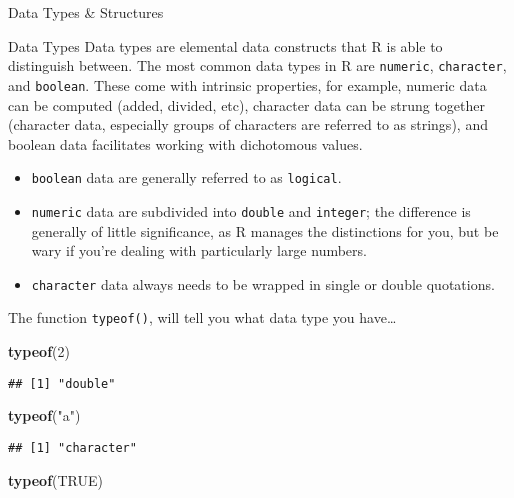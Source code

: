 \documentclass[
  ignorenonframetext,
]{beamer}
\newenvironment{Shaded}{\begin{snugshade}}{\end{snugshade}}
\newcommand{\ConstantTok}[1]{\textcolor[rgb]{0.56,0.35,0.01}{#1}}
\newcommand{\DecValTok}[1]{\textcolor[rgb]{0.00,0.00,0.81}{#1}}
\newcommand{\FunctionTok}[1]{\textcolor[rgb]{0.13,0.29,0.53}{\textbf{#1}}}
\newcommand{\NormalTok}[1]{#1}
\newcommand{\StringTok}[1]{\textcolor[rgb]{0.31,0.60,0.02}{#1}}
\providecommand{\tightlist}{%
  \setlength{\itemsep}{0pt}\setlength{\parskip}{0pt}}
\begin{document}
\begin{frame}[fragile]{Data Types \& Structures}
\protect\hypertarget{data-types-structures}{}
\begin{block}{Data Types}
\protect\hypertarget{data-types}{}
Data types are elemental data constructs that R is able to distinguish
between. The most common data types in R are \texttt{numeric},
\texttt{character}, and \texttt{boolean}. These come with intrinsic
properties, for example, numeric data can be computed (added, divided,
etc), character data can be strung together (character data, especially
groups of characters are referred to as strings), and boolean data
facilitates working with dichotomous values.

\begin{itemize}
\tightlist
\item
  \texttt{boolean} data are generally referred to as \texttt{logical}.
\item
  \texttt{numeric} data are subdivided into \texttt{double} and
  \texttt{integer}; the difference is generally of little significance,
  as R manages the distinctions for you, but be wary if you're dealing
  with particularly large numbers.
\item
  \texttt{character} data always needs to be wrapped in single or double
  quotations.
\end{itemize}

The function \texttt{typeof()}, will tell you what data type you
have\ldots{}

\begin{Shaded}
\begin{Highlighting}[]
\FunctionTok{typeof}\NormalTok{(}\DecValTok{2}\NormalTok{)}
\end{Highlighting}
\end{Shaded}

\begin{verbatim}
## [1] "double"
\end{verbatim}

\begin{Shaded}
\begin{Highlighting}[]
\FunctionTok{typeof}\NormalTok{(}\StringTok{"a"}\NormalTok{)}
\end{Highlighting}
\end{Shaded}

\begin{verbatim}
## [1] "character"
\end{verbatim}

\begin{Shaded}
\begin{Highlighting}[]
\FunctionTok{typeof}\NormalTok{(}\ConstantTok{TRUE}\NormalTok{)}
\end{Highlighting}
\end{Shaded}


\end{block}
\end{frame}
\end{document}
